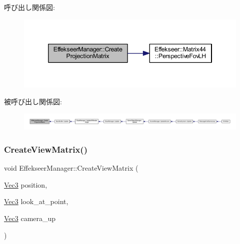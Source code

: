 呼び出し関係図\+:\nopagebreak
\begin{figure}[H]
\begin{center}
\leavevmode
\includegraphics[width=346pt]{class_effekseer_manager_ae4faa1c46f9b4a372559567748df2384_cgraph}
\end{center}
\end{figure}
被呼び出し関係図\+:
\nopagebreak
\begin{figure}[H]
\begin{center}
\leavevmode
\includegraphics[width=350pt]{class_effekseer_manager_ae4faa1c46f9b4a372559567748df2384_icgraph}
\end{center}
\end{figure}
\mbox{\label{class_effekseer_manager_ad36867f996af58d4b788a17cf25244a7}} 
\subsubsection{\texorpdfstring{Create\+View\+Matrix()}{CreateViewMatrix()}}
{\footnotesize\ttfamily void Effekseer\+Manager\+::\+Create\+View\+Matrix (\begin{DoxyParamCaption}\item[{\mbox{\hyperlink{_vector3_d_8h_ab16f59e4393f29a01ec8b9bbbabbe65d}{Vec3}}}]{position,  }\item[{\mbox{\hyperlink{_vector3_d_8h_ab16f59e4393f29a01ec8b9bbbabbe65d}{Vec3}}}]{look\+\_\+at\+\_\+point,  }\item[{\mbox{\hyperlink{_vector3_d_8h_ab16f59e4393f29a01ec8b9bbbabbe65d}{Vec3}}}]{camera\+\_\+up }\end{DoxyParamCaption})\hspace{0.3cm}{\ttfamily [static]}}



